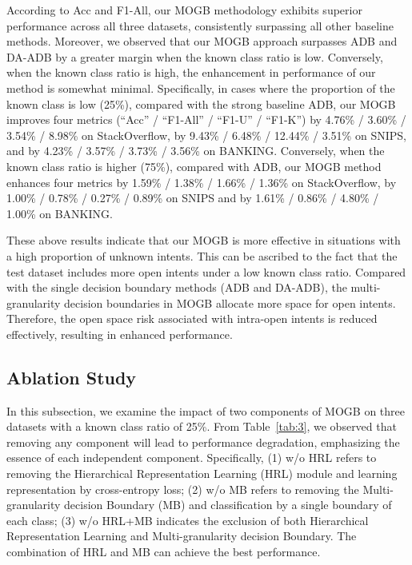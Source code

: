 \documentclass[letterpaper]{article} %
\theoremstyle{definition}
\begin{document}
According to Acc and F1-All, our MOGB methodology exhibits superior performance across all three datasets, consistently surpassing all other baseline methods. 
Moreover, we observed that our MOGB approach surpasses ADB and DA-ADB by a greater margin when the known class ratio is low. Conversely, when the known class ratio is high, the enhancement in performance of our method is somewhat minimal. 
Specifically, in cases where the proportion of the known class is low (25\%), compared with the strong baseline ADB, our MOGB improves four metrics (``Acc'' / ``F1-All'' / ``F1-U'' / ``F1-K'') by 4.76\% / 3.60\% / 3.54\% / 8.98\% on StackOverflow, by 9.43\% / 6.48\% / 12.44\% / 3.51\% on SNIPS, and by 4.23\% / 3.57\% / 3.73\% / 3.56\% on BANKING. Conversely, when the known class ratio is higher (75\%), compared with ADB, our MOGB method enhances four metrics by 1.59\% / 1.38\% / 1.66\% / 1.36\% on StackOverflow, by 1.00\% / 0.78\% / 0.27\% / 0.89\% on SNIPS and by 1.61\% / 0.86\% / 4.80\% / 1.00\% on BANKING. 

These above results indicate that our MOGB is more effective in situations with a high proportion of unknown intents. 
This can be ascribed to the fact that the test dataset includes more open intents under a low known class ratio. Compared with the single decision boundary methods (ADB and DA-ADB), the multi-granularity decision boundaries in MOGB allocate more space for open intents. Therefore, the open space risk associated with intra-open intents is reduced effectively, resulting in enhanced performance.

\subsection{Ablation Study}
In this subsection, we examine the impact of two components of MOGB on three datasets with a known class ratio of 25\%. From Table~\ref{tab:3}, we observed that removing any component will lead to performance degradation, emphasizing the essence of each independent component. Specifically, (1) w/o HRL refers to removing the Hierarchical Representation Learning (HRL) module and learning representation by cross-entropy loss; (2) w/o MB refers to removing the Multi-granularity decision Boundary (MB) and classification by a single boundary of each class; (3) w/o HRL+MB indicates the exclusion of both Hierarchical Representation Learning and Multi-granularity decision Boundary. The combination of HRL and MB can achieve the best performance.
\end{document}
